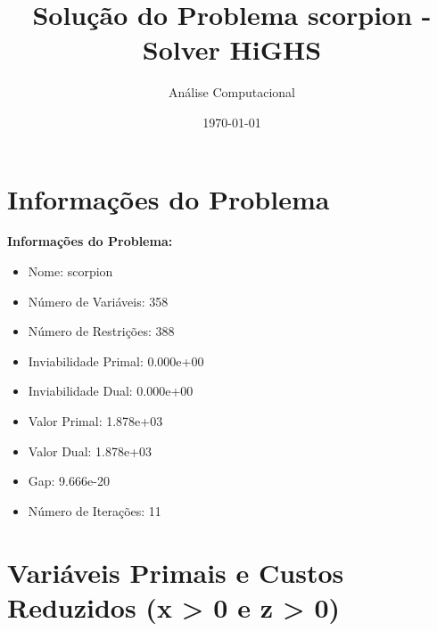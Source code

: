 \documentclass[12pt]{article}
\title{Solução do Problema scorpion - Solver HiGHS}
\author{Análise Computacional}
\date{\today}
\begin{document}
\maketitle

\section{Informações do Problema}

\textbf{Informações do Problema:}
\begin{itemize}
\item Nome: scorpion
\item Número de Variáveis: 358
\item Número de Restrições: 388
\item Inviabilidade Primal: 0.000e+00
\item Inviabilidade Dual: 0.000e+00
\item Valor Primal: 1.878e+03
\item Valor Dual: 1.878e+03
\item Gap: 9.666e-20
\item Número de Iterações: 11
\end{itemize}


\section{Variáveis Primais e Custos Reduzidos (x > 0 e z > 0)}
\end{document}
